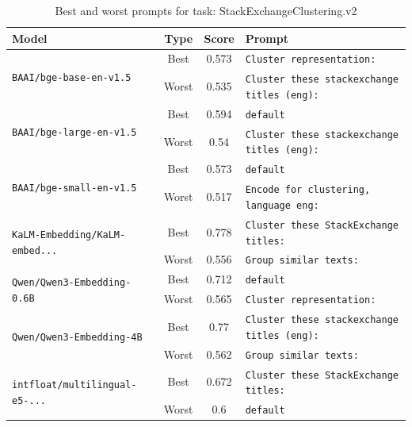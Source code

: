 \begin{table}[t]
\centering
\small
\caption{Best and worst prompts for task: StackExchangeClustering.v2}
\begin{tabular}{|p{}|c|c|p{}|}
\hline
Model & Type & Score & Prompt \\
\hline
\multirow{2}{=}{\raggedright\texttt{BAAI/\allowbreak bge-\allowbreak base-\allowbreak en-\allowbreak v1.5}} & Best & 0.573 & \texttt{Cluster representation:} \\
\cline{2-4}
& Worst & 0.535 & \texttt{Cluster these stackexchange titles (eng):} \\
\hline
\multirow{2}{=}{\raggedright\texttt{BAAI/\allowbreak bge-\allowbreak large-\allowbreak en-\allowbreak v1.5}} & Best & 0.594 & \texttt{default} \\
\cline{2-4}
& Worst & 0.54 & \texttt{Cluster these stackexchange titles (eng):} \\
\hline
\multirow{2}{=}{\raggedright\texttt{BAAI/\allowbreak bge-\allowbreak small-\allowbreak en-\allowbreak v1.5}} & Best & 0.573 & \texttt{default} \\
\cline{2-4}
& Worst & 0.517 & \texttt{Encode for clustering, language eng:} \\
\hline
\multirow{2}{=}{\raggedright\texttt{KaLM-\allowbreak Embedding/\allowbreak KaLM-\allowbreak embed...}} & Best & 0.778 & \texttt{Cluster these StackExchange titles:} \\
\cline{2-4}
& Worst & 0.556 & \texttt{Group similar texts:} \\
\hline
\multirow{2}{=}{\raggedright\texttt{Qwen/\allowbreak Qwen3-\allowbreak Embedding-\allowbreak 0.6B}} & Best & 0.712 & \texttt{default} \\
\cline{2-4}
& Worst & 0.565 & \texttt{Cluster representation:} \\
\hline
\multirow{2}{=}{\raggedright\texttt{Qwen/\allowbreak Qwen3-\allowbreak Embedding-\allowbreak 4B}} & Best & 0.77 & \texttt{Cluster these stackexchange titles (eng):} \\
\cline{2-4}
& Worst & 0.562 & \texttt{Group similar texts:} \\
\hline
\multirow{2}{=}{\raggedright\texttt{intfloat/\allowbreak multilingual-\allowbreak e5-\allowbreak ...}} & Best & 0.672 & \texttt{Cluster these StackExchange titles:} \\
\cline{2-4}
& Worst & 0.6 & \texttt{default} \\
\hline
\end{tabular}
\end{table}

